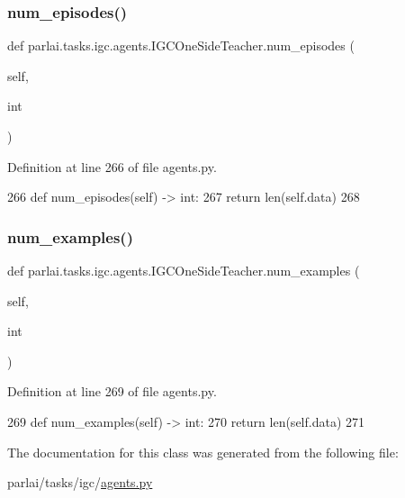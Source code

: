 \subsubsection{\texorpdfstring{num\+\_\+episodes()}{num\_episodes()}}
{\footnotesize\ttfamily def parlai.\+tasks.\+igc.\+agents.\+I\+G\+C\+One\+Side\+Teacher.\+num\+\_\+episodes (\begin{DoxyParamCaption}\item[{}]{self,  }\item[{}]{int }\end{DoxyParamCaption})}



Definition at line 266 of file agents.\+py.


\begin{DoxyCode}
266     \textcolor{keyword}{def }num\_episodes(self) -> int:
267         \textcolor{keywordflow}{return} len(self.data)
268 
\end{DoxyCode}
\mbox{\label{classparlai_1_1tasks_1_1igc_1_1agents_1_1IGCOneSideTeacher_a39b29631ff931751e6aa35119a09e399}} 
\subsubsection{\texorpdfstring{num\+\_\+examples()}{num\_examples()}}
{\footnotesize\ttfamily def parlai.\+tasks.\+igc.\+agents.\+I\+G\+C\+One\+Side\+Teacher.\+num\+\_\+examples (\begin{DoxyParamCaption}\item[{}]{self,  }\item[{}]{int }\end{DoxyParamCaption})}



Definition at line 269 of file agents.\+py.


\begin{DoxyCode}
269     \textcolor{keyword}{def }num\_examples(self) -> int:
270         \textcolor{keywordflow}{return} len(self.data)
271 
\end{DoxyCode}


The documentation for this class was generated from the following file\+:\begin{DoxyCompactItemize}
\item 
parlai/tasks/igc/\hyperlink{parlai_2tasks_2igc_2agents_8py}{agents.\+py}\end{DoxyCompactItemize}
